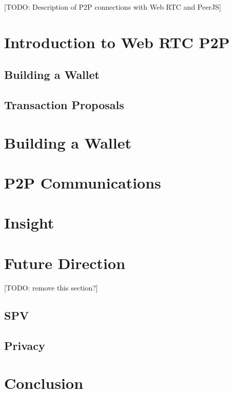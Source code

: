 \documentclass{article}
\begin{document}
[TODO: Description of P2P connections with Web RTC and PeerJS]

\section{Introduction to Web RTC P2P}

\subsection{Building a Wallet}

\subsection{Transaction Proposals}

\section{Building a Wallet}

\section{P2P Communications}

\section{Insight}

\section{Future Direction}

[TODO: remove this section?]

\subsection{SPV}

\subsection{Privacy}

\section{Conclusion}
\end{document}
